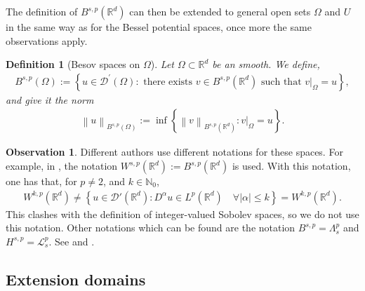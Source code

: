 \documentclass[
    a4paper,
    DIV=14,
    abstract=true,
    numbers=noenddot
]
{scrartcl}
\newtheorem{definition}[theorem]{Definition}
\theoremstyle{definition}
\newtheorem{observation}{Observation}
\newcommand{\set}[1]{\left\{#1\right\}}
\renewcommand{\norm}[1]{\left\lVert #1 \right\rVert}\renewcommand{\abs}[1]{\left| #1 \right|}
\newcommand\restr[2]{\left.#1\right|_{#2}}
\newcommand{\N}{\mathbb{N}}
\newcommand{\R}{\mathbb{R}}
\newcommand{\Dd}{\mathcal{D}}
\newcommand{\Ll}{\mathcal{L}}
\begin{document}
The definition of $B^{s,p}(\R^d)$ can then be extended to general open sets $\Omega $ and  $U$ in the same way as for the Bessel potential spaces, once more the same observations apply.
\begin{definition}[Besov spaces on $\Omega $]\label{besov def on U}
    Let $\Omega  \subset \R^d$ be an smooth. We define,
    \begin{align*}
        B^{s,p}(\Omega):=\left\{u \in \mathcal{D}^{\prime}(\Omega ): \text{ there exists } v \in B^{s,p}(\R^d) \text{ such that } \restr{v}{\Omega }=u\right\},
    \end{align*}
    and give it the norm
    \begin{align*}
        \norm{u}_{B^{s,p}(\Omega)}:= \inf \set{\norm{v}_{B^{s,p}(\R^d)}: \restr{v}{\Omega }=u}.
    \end{align*}
\end{definition}

\begin{observation}
    Different authors use different notations for these spaces. For example, in \cite{triebel1992theory}, the notation $W^{s,p}(\R^d):= B^{s,p}(\R^d)$ is used. With this notation, one has that, for $p \neq 2$, and $k \in \N_0$,
    \begin{align*}
        W^{k,p}(\R^d) \neq \set{ u \in \Dd'(\R^d) : D^\alpha u \in L^p(\R^d) \quad \forall \abs{\alpha}\leq   k}= W^{k,p}(\R^d).
    \end{align*}
    This clashes with the definition of integer-valued Sobolev spaces, so we do not use this notation. Other notations which can be found are  the notation $B^{s,p}= \Lambda^{p}_s$ and $H^{s,p}= \Ll ^{p}_s$. See \cite{stein1970singular} and \cite{biccari2018local}.
\end{observation}

\subsection{Extension domains}
\end{document}
